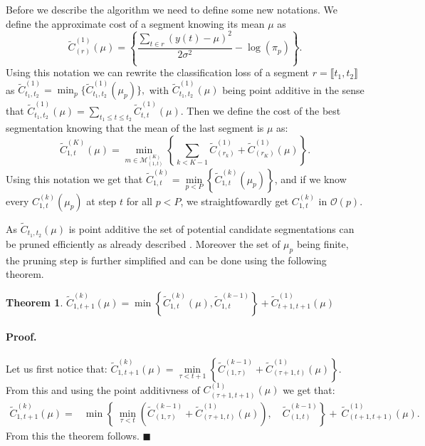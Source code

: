 \documentclass{llncs}
\newtheorem{theo}{Theorem}[section]    %
\begin{document}
Before we describe the algorithm we need to define some new notations. We define the approximate cost of a segment knowing its mean $\mu$ as 
$$ \widetilde{C}_{(r)}^{(1)}   (\mu) = \left\{ \frac{\sum_{t \in r} (y(t)- \mu)^2  } {2 \sigma^2 } - \log(\pi_p) \right\}.$$
Using this notation we can rewrite the classification loss of a segment $r = \llbracket t_1, t_2 \rrbracket$ as $\widetilde{C}_{t_1, t_2}^{(1)}  = \min_p \{  \widetilde{C}_{t_1, t_2}^{(1)}  (\mu_p) \},$ with $\widetilde{C}_{t_1, t_2}^{(1)}  (\mu)$ being point additive in the sense that $\widetilde{C}_{t_1, t_2}^{(1)}  (\mu) = \underset{ t_1 \leq t \leq t_2}{\sum} \widetilde{C}_{t, t}^{(1)}  (\mu).$ Then we define the cost of the best segmentation knowing that the mean of the last segment is $\mu$ as:
$$\widetilde{C}_{1, t}^{(K)}(\mu) = \underset{{m \in \mathcal{M}^{(K)}_{(1, t)}}}{\min} \left\{ \sum_{k < K-1}  \widetilde{C}^{(1)}_{(r_k)}  + \widetilde{C}^{(1)}_{(r_K)}(\mu) \right\}.$$
Using this notation we get that $ \widetilde{C}_{1, t}^{(k)}  = \underset{p < P}{\min} \left\{ \widetilde{C}_{1, t}^{(k)}(\mu_p) \right\}$, and if we know every $C_{1, t}^{(k)}(\mu_p)$ at step $t$ for all $p< P$, we straightfowardly get $C_{1, t}^{(k)}$ in $\mathcal{O}(p)$.

As $\widetilde{C}_{t_1, t_2} (\mu)$ is point additive the set of potential candidate segmentations can be pruned efficiently as already described \cite{rigaill_2010}. Moreover the set of $\mu_p$ being finite, the 
pruning step is further simplified and can be done using the following theorem.

\begin{theo}
$ \widetilde{C}_{1, t+1}^{(k)}(\mu) = \min \left\{ \widetilde{C}_{1, t}^{(k)}(\mu),  \widetilde{C}_{1, t}^{(k-1)} \right\} +  \widetilde{C}_{t+1, t+1}^{(1)}(\mu) $
\end{theo}

\paragraph{Proof. } Let us first notice that: 
$ \widetilde{C}_{1, t+1}^{(k)}(\mu) =  \underset{{\tau < t+1} }{\min}\left\{  \widetilde{C}_{(1,\tau)}^{(k-1)}  +  \widetilde{C}_{(\tau+1, t)}^{(1)}(\mu) \right\}
.$
From this and using the point additivness of $ C_{(\tau+1, t+1)}^{(1)}(\mu)$ we get that:
\begin{eqnarray*}
 \widetilde{C}_{1, t+1}^{(k)}(\mu) = & \min \left\{ \ \underset{{\tau < t}}{\min} \left(  \widetilde{C}_{(1,\tau)}^{(k-1)}  +  \widetilde{C}_{(\tau+1, t)}^{(1)}(\mu) \right), \quad  \widetilde{C}_{(1,t)}^{(k-1)}  \right\} +  \ \widetilde{C}_{(t+1, t+1)}^{(1)}(\mu).
\end{eqnarray*}
\noindent From this the theorem follows. $\blacksquare$ \\
\end{document}
